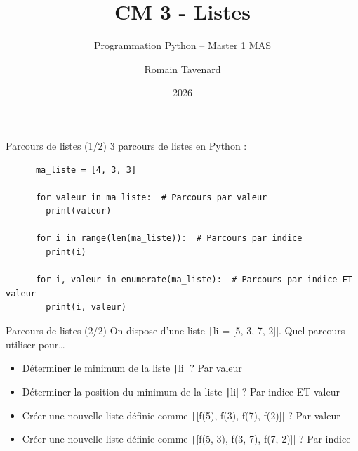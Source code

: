 \documentclass[10pt]{beamer}
\title[M1 MAS -- Python -- Listes]{CM 3 - Listes}
\subtitle{Programmation Python -- Master 1 MAS}
\author{Romain Tavenard}
\date{2026}
\institute{%
\hypersetup{urlcolor=.}
\makebox[2.2ex][c]{\faEnvelope}\enspace\href{mailto:romain.tavenard@univ-rennes2.fr}{\texttt{romain.tavenard@univ-rennes2.fr}}\\%
}
\begin{document}
\maketitle


\begin{frame}[fragile]{Parcours de listes (1/2)}  
  3 parcours de listes en Python :

  \begin{beamercodeblock}
    \begin{verbatim}
      ma_liste = [4, 3, 3]

      for valeur in ma_liste:  # Parcours par valeur
        print(valeur)
      
      for i in range(len(ma_liste)):  # Parcours par indice
        print(i)
      
      for i, valeur in enumerate(ma_liste):  # Parcours par indice ET valeur
        print(i, valeur)
    \end{verbatim}
  \end{beamercodeblock}
\end{frame}

\begin{frame}[fragile]{Parcours de listes (2/2)}  
  On dispose d'une liste \texttt|li = [5, 3, 7, 2]|.
  Quel parcours utiliser pour\dots

  \begin{itemize}
    \item Déterminer le minimum de la liste \texttt|li| ? \pause \alert{Par valeur}
    \item Déterminer la position du minimum de la liste \texttt|li| ? \pause \alert{Par indice ET valeur}
    \item Créer une nouvelle liste définie comme \texttt|[f(5), f(3), f(7), f(2)]| ? \pause \alert{Par valeur}
    \item Créer une nouvelle liste définie comme \texttt|[f(5, 3), f(3, 7), f(7, 2)]| ? \pause \alert{Par indice}
  \end{itemize}
\end{frame}
\end{document}
